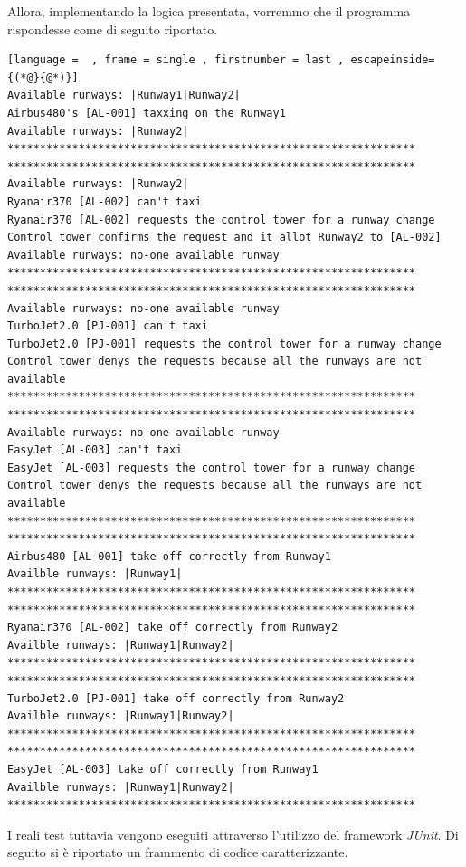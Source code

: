 \documentclass{article}
\begin{document}
\begin{sloppy}
Allora, implementando la logica presentata, vorremmo che il programma rispondesse come di seguito riportato.

\bigbreak
\begin{lstlisting}[language =  , frame = single , firstnumber = last , escapeinside={(*@}{@*)}]
Available runways: |Runway1|Runway2|
Airbus480's [AL-001] taxxing on the Runway1
Available runways: |Runway2|
***************************************************************
***************************************************************
Available runways: |Runway2|
Ryanair370 [AL-002] can't taxi
Ryanair370 [AL-002] requests the control tower for a runway change
Control tower confirms the request and it allot Runway2 to [AL-002]
Available runways: no-one available runway
***************************************************************
***************************************************************
Available runways: no-one available runway
TurboJet2.0 [PJ-001] can't taxi
TurboJet2.0 [PJ-001] requests the control tower for a runway change
Control tower denys the requests because all the runways are not available
***************************************************************
***************************************************************
Available runways: no-one available runway
EasyJet [AL-003] can't taxi
EasyJet [AL-003] requests the control tower for a runway change
Control tower denys the requests because all the runways are not available
***************************************************************
***************************************************************
Airbus480 [AL-001] take off correctly from Runway1
Availble runways: |Runway1|
***************************************************************
***************************************************************
Ryanair370 [AL-002] take off correctly from Runway2
Availble runways: |Runway1|Runway2|
***************************************************************
***************************************************************
TurboJet2.0 [PJ-001] take off correctly from Runway2
Availble runways: |Runway1|Runway2|
***************************************************************
***************************************************************
EasyJet [AL-003] take off correctly from Runway1
Availble runways: |Runway1|Runway2|
***************************************************************

\end{lstlisting}

\bigbreak
I reali test tuttavia vengono eseguiti attraverso l'utilizzo del framework \textit{JUnit}. Di seguito si è riportato un frammento di codice caratterizzante.
\bigbreak


\end{sloppy}
\end{document}
